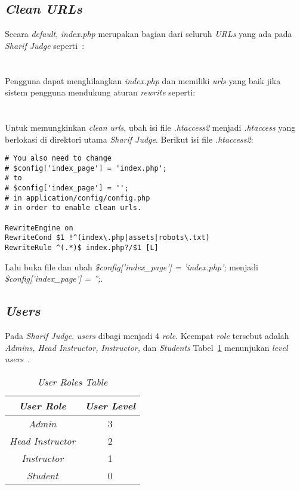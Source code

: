 \subsection{\textit{Clean URLs}}
Secara \textit{default}, \textit{index.php} merupakan bagian dari seluruh \textit{URLs} yang ada pada \textit{Sharif Judge} seperti~\cite{mjnaderi:14:sharifjudgedoc}:  \\
 \\
 \\
Pengguna dapat menghilangkan \textit{index.php} dan memiliki \textit{urls} yang baik jika sistem pengguna mendukung aturan \textit{rewrite} seperti: \\ 
\\
\\
Untuk memungkinkan \textit{clean urls}, ubah isi file \textit{.htaccess2} menjadi \textit{.htaccess} yang berlokasi di direktori utama \textit{Sharif Judge}.
Berikut isi file \textit{.htaccess2}: 
\begin{lstlisting}[basicstyle=\ttfamily, frame=single,
columns=fullflexible, keepspaces=true, breaklines=true]
# You also need to change 
# $config['index_page'] = 'index.php';
# to
# $config['index_page'] = '';
# in application/config/config.php
# in order to enable clean urls.

RewriteEngine on
RewriteCond $1 !^(index\.php|assets|robots\.txt)
RewriteRule ^(.*)$ index.php?/$1 [L]
\end{lstlisting}
Lalu buka file  dan ubah \textit{\$config['index\_page'] = 'index.php';} menjadi \textit{\$config['index\_page'] = '';}.

\subsection{\textit{Users}}
Pada \textit{Sharif Judge}, \textit{users} dibagi menjadi 4 \textit{role}. Keempat \textit{role} tersebut adalah \textit{Admins, Head Instructor, Instructor, }dan \textit{Students}
Tabel~\ref{tab:userrole} menunjukan \textit{level users}~\cite{mjnaderi:14:sharifjudgedoc}.

\begin{table}[H] %
	\centering 
	\caption{\textit{User Roles Table}}
	\label{tab:userrole}
	\begin{tabular}{|c|c|}
		\hline
		\textit{\textbf{User Role}} & \textit{\textbf{User Level}} \\
		\hline
		\textit{Admin} & 3 \\
		\hline
		\textit{Head Instructor} & 2 \\
		\hline
		\textit{Instructor} & 1 \\
		\hline
		\textit{Student} & 0 \\
		\hline		
	\end{tabular} 
\end{table}

